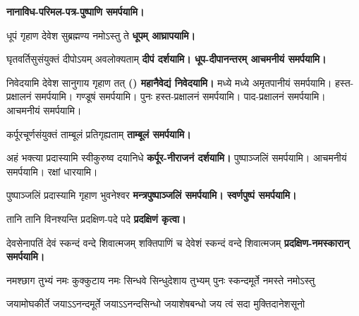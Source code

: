\begin{center}
\begingroup
\setlength{\columnseprule}{1pt}
\let\chapt\sect



\endgroup

\textbf{\devAya{} नानाविध-परिमल-पत्र-पुष्पाणि समर्पयामि।}


{धूपं गृहाण देवेश सुब्रह्मण्य नमोऽस्तु ते}
\textbf{\devAya{} धूपम् आघ्रापयामि।}

{घृतवर्तिसुसंयुक्तं दीपोऽयम् अवलोक्यताम्}
\textbf{\devAya{} दीपं दर्शयामि। धूप-दीपानन्तरम् आचमनीयं समर्पयामि।}

{निवेदयामि देवेश सानुगाय गृहाण तत्}
\textbf{\devAya{} () महानैवेद्यं निवेदयामि। }
मध्ये मध्ये अमृतपानीयं समर्पयामि। हस्त-प्रक्षालनं समर्पयामि। गण्डूषं समर्पयामि। पुनः हस्त-प्रक्षालनं समर्पयामि।
 पाद-प्रक्षालनं समर्पयामि। आचमनीयं समर्पयामि।

{कर्पूरचूर्णसंयुक्तं ताम्बूलं प्रतिगृह्यताम्}
\textbf{\devAya{} ताम्बूलं समर्पयामि।}

{अहं भक्त्या प्रदास्यामि स्वीकुरुष्व दयानिधे}
\textbf{\devAya{} कर्पूर-नीराजनं दर्शयामि। }
पुष्पाञ्जलिं समर्पयामि। आचमनीयं समर्पयामि। रक्षां धारयामि।

{पुष्पाञ्जलिं प्रदास्यामि गृहाण भुवनेश्वर}
\textbf{\devAya{} मन्त्रपुष्पाञ्जलिं समर्पयामि। स्वर्णपुष्पं समर्पयामि।}

{तानि तानि विनश्यन्ति प्रदक्षिण-पदे पदे}
\textbf{प्रदक्षिणं कृत्वा।}
\medskip

{देवसेनापतिं देवं स्कन्दं वन्दे शिवात्मजम्}
{शक्तिपाणिं च देवेशं स्कन्दं वन्दे शिवात्मजम्}
\textbf{\devAya{} प्रदक्षिण-नमस्कारान् समर्पयामि।}

{नमश्छाग तुभ्यं नमः कुक्कुटाय}
{नमः सिन्धवे सिन्धुदेशाय तुभ्यम्}
{पुनः स्कन्दमूर्ते नमस्ते नमोऽस्तु}

{जयामोघकीर्ते जयाऽऽनन्दमूर्ते}
{जयाऽऽनन्दसिन्धो जयाशेषबन्धो}
{जय त्वं सदा मुक्तिदानेशसूनो}


\end{center}
